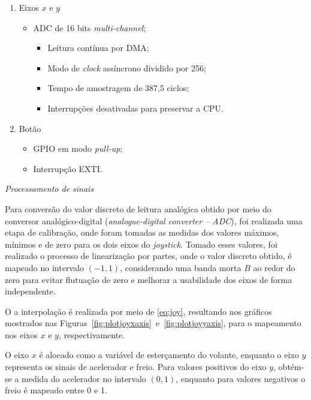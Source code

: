 \begin{enumerate}
	\item Eixos $x$ e $y$
	\begin{itemize}
		\item ADC de 16 bits \textit{multi-channel};
		\begin{itemize}
			\item Leitura contínua por DMA;
			\item Modo de \textit{clock} assíncrono dividido por 256;
			\item Tempo de amostragem de 387,5 ciclos;
			\item Interrupções desativadas para preservar a CPU.
			
		\end{itemize}				
	\end{itemize}
	
	\item Botão
	\begin{itemize}
		\item GPIO em modo \textit{pull-up};
		\item Interrupção EXTI.
		
	\end{itemize}

\end{enumerate}

\noindent \textit{Processamento de sinais}

Para conversão do valor discreto de leitura analógica obtido por meio do conversor analógico-digital (\textit{analogue-digital converter -- ADC}), foi realizada uma etapa de calibração, onde foram tomadas as medidas dos valores máximos, mínimos e de zero para os dois eixos do \textit{joystick}. Tomado esses valores, foi realizado o processo de linearização por partes, onde o valor discreto obtido, é mapeado no intervalo $(-1, 1)$, considerando uma banda morta $B$ ao redor do zero para evitar flutuação de zero e melhorar a usabilidade dos eixos de forma independente.

O a interpolação é realizada por meio de \eqref{eq:joy}, resultando nos gráficos mostrados nas Figuras~\ref{fig:plotjoyxaxis}~e~\ref{fig:plotjoyyaxis}, para o mapeamento nos eixos $x$ e $y$, respectivamente.

O eixo $x$ é alocado como a variável de esterçamento do volante, enquanto o eixo $y$ representa os sinais de acelerador e freio. Para valores positivos do eixo $y$, obtém-se a medida do acelerador no intervalo $(0,1)$, enquanto para valores negativos o freio é mapeado entre 0 e 1.

